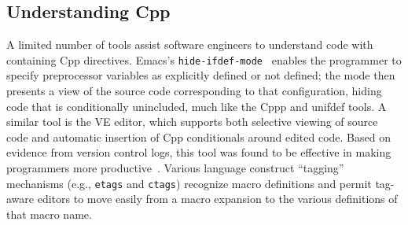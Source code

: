 \documentclass[10pt]{article}
\def\nummacrodefs{26182}        %
\begin{document}



\subsection{Understanding Cpp}

A limited number of tools assist software engineers to
understand code with containing Cpp directives.  Emacs's
\texttt{hide-ifdef-mode}~\cite{GNUEmacs19.26} enables the programmer to specify
preprocessor variables as explicitly defined or not defined; the mode then
presents a view of the source code corresponding to that configuration,
hiding code that is conditionally unincluded, much like the Cppp and
unifdef tools.  A similar tool is the VE editor, which supports both
selective viewing of source code and automatic insertion of Cpp
conditionals around edited code.  Based on evidence from version control
logs, this tool was found to be effective in making programmers more
productive~\cite{AtkinsBGM99}.  Various language construct ``tagging''
mechanisms (e.g., \texttt{etags} and \texttt{ctags}) recognize macro
definitions and permit tag-aware editors to move easily from a macro
expansion to the various definitions of that macro name.

\end{document}
